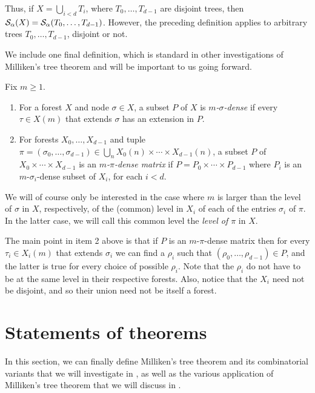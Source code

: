 \noindent Thus, if $X = \bigcup_{i < d} T_i$, where $T_0,\ldots,T_{d-1}$ are disjoint trees, then $\mathcal{S}_{\alpha}({X}) = \mathcal{S}_{\alpha}({T_0,\ldots,T_{d-1}})$. However, the preceding definition applies to arbitrary trees $T_0,\ldots,T_{d-1}$, disjoint or not.

We include one final definition, which is standard in other investigations of Milliken's tree theorem and will be important to us going forward.

\begin{definition}
	Fix $m \geq 1$.
	\begin{enumerate}
		\item For a forest $X$ and node $\sigma \in X$, a subset $P$ of $X$ is \emph{$m$-$\sigma$-dense} if every $\tau \in X(m)$ that extends $\sigma$ has an extension in $P$.
		\item For forests $X_0,\ldots,X_{d-1}$ and tuple $\pi = (\sigma_0,\ldots,\sigma_{d-1}) \in \bigcup_{n} X_0(n) \times \cdots \times X_{d-1}(n)$, a subset $P$ of $X_0 \times \cdots \times X_{d-1}$ is an \emph{$m$-$\pi$-dense matrix} if $P = P_0 \times \cdots \times P_{d-1}$ where $P_i$ is an $m$-$\sigma_i$-dense subset of $X_i$, for each $i < d$.
	\end{enumerate}
\end{definition}

\noindent We will of course only be interested in the case where $m$ is larger than the level of $\sigma$ in $X$, respectively, of the (common) level in $X_i$ of each of the entries $\sigma_i$ of $\pi$. In the latter case, we will call this common level the \emph{level of $\pi$} in $X$.

The main point in item 2 above is that if $P$ is an $m$-$\pi$-dense matrix then for every $\tau_i \in X_i(m)$ that extends $\sigma_i$ we can find a $\rho_i$ such that $(\rho_0,\ldots,\rho_{d-1}) \in P$, and the latter is true for every choice of possible $\rho_i$. Note that the $\rho_i$ do not have to be at the same level in their respective forests. Also, notice that the $X_i$ need not be disjoint, and so their union need not be itself a forest.

\section{Statements of theorems}\label{sec:bkg_stmts}

In this section, we can finally define Milliken's tree theorem and its combinatorial variants that we will investigate in , as well as the various application of Milliken's tree theorem that we will discuss in .

